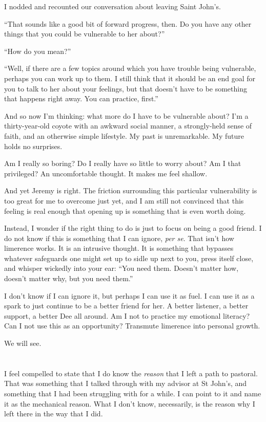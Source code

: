 I nodded and recounted our conversation about leaving Saint John's.

``That sounds like a good bit of forward progress, then. Do you have any other things that you could be vulnerable to her about?''

``How do you mean?''

``Well, if there are a few topics around which you have trouble being vulnerable, perhaps you can work up to them. I still think that it should be an end goal for you to talk to her about your feelings, but that doesn't have to be something that happens right away. You can practice, first.''

And so now I'm thinking: what more do I have to be vulnerable about? I'm a thirty-year-old coyote with an awkward social manner, a strongly-held sense of faith, and an otherwise simple lifestyle. My past is unremarkable. My future holds no surprises.

Am I really so boring? Do I really have so little to worry about? Am I that privileged? An uncomfortable thought. It makes me feel shallow.

And yet Jeremy is right. The friction surrounding this particular vulnerability is too great for me to overcome just yet, and I am still not convinced that this feeling is real enough that opening up is something that is even worth doing.

Instead, I wonder if the right thing to do is just to focus on being a good friend. I do not know if this is something that I can ignore, \emph{per se}. That isn't how limerence works. It is an intrusive thought. It is something that bypasses whatever safeguards one might set up to sidle up next to you, press itself close, and whisper wickedly into your ear: ``You need them. Doesn't matter how, doesn't matter why, but you need them.''

I don't know if I can ignore it, but perhaps I can use it as fuel. I can use it as a spark to just continue to be a better friend for her. A better listener, a better support, a better Dee all around. Am I not to practice my emotional literacy? Can I not use this as an opportunity? Transmute limerence into personal growth.

We will see.

\section{}

I feel compelled to state that I do know the \emph{reason} that I left a path to pastoral. That was something that I talked through with my advisor at St John's, and something that I had been struggling with for a while. I can point to it and name it as the mechanical reason. What I don't know, necessarily, is the reason why I left there in the way that I did.

